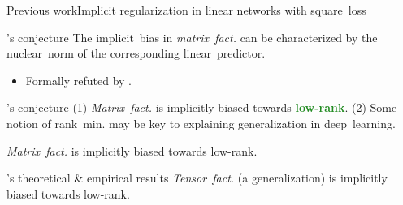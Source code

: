 \documentclass[handout,usenames,dvipsnames]{beamer} %
\newcommand{\true}[1]{{\textcolor{ForestGreen}{\textbf{#1}}}}
\begin{document}
\begin{frame}{Previous work}{Implicit regularization in linear networks with square~loss}
    \pause
    \begin{block}{\cite{gunasekar2018implicit}’s conjecture }
        The implicit~bias in \emph{matrix~fact.} can be characterized by the \alert{nuclear~norm} of the corresponding linear~predictor.
    \end{block}
    \pause
    \begin{itemize}
        \item \alert{Formally refuted} by \cite{li2020towards}.
    \end{itemize}
    \pause
    \begin{block}{\cite{razin2020implicit}’s conjecture}
        (1) \emph{Matrix~fact.} is implicitly biased towards \true{low-rank}. (2) Some notion of rank~min. may be key to explaining generalization in deep~learning.
    \end{block}
    \pause
    \begin{exampleblock}{\cite{li2020towards} \hfill\checkmark}
        \emph{Matrix~fact.} is implicitly biased towards low-rank.
    \end{exampleblock}
    \pause
    \begin{exampleblock}{\cite{razin2021implicit}’s theoretical \& empirical results \hfill\checkmark}
        \emph{Tensor~fact.} (a generalization) is implicitly biased towards low-rank.
    \end{exampleblock}
    

\end{frame}
\end{document}
